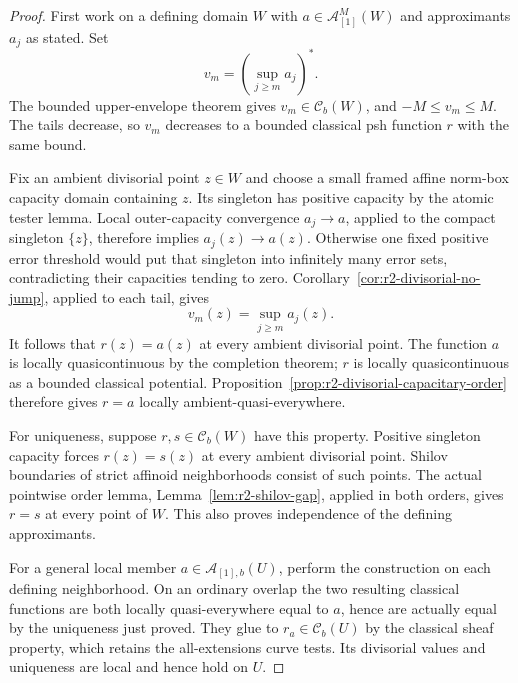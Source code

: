 \documentclass[11pt,a4paper]{article}
\numberwithin{equation}{section}
\theoremstyle{definition}
\theoremstyle{remark}
\newcommand{\Cb}{\mathcal C_b}
\begin{document}
\begin{proof}
First work on a defining domain $W$ with
$a\in\mathcal A^M_{[1]}(W)$ and approximants $a_j$ as stated.
Set
\[
 v_m=\left(\sup_{j\geq m}a_j\right)^*.
\]
The bounded upper-envelope theorem gives $v_m\in\Cb(W)$,
and $-M\leq v_m\leq M$. The tails decrease, so $v_m$ decreases
to a bounded classical psh function $r$ with the same bound.

Fix an ambient divisorial point $z\in W$ and choose a small
framed affine norm-box capacity domain containing $z$. Its
singleton has positive capacity by the atomic tester lemma.
Local outer-capacity convergence $a_j\to a$, applied to the
compact singleton $\{z\}$, therefore implies
$a_j(z)\to a(z)$. Otherwise one fixed positive error threshold
would put that singleton into infinitely many error sets,
contradicting their capacities tending to zero.
Corollary~\ref{cor:r2-divisorial-no-jump}, applied to each tail,
gives
\[
 v_m(z)=\sup_{j\geq m}a_j(z).
\]
It follows that $r(z)=a(z)$ at every ambient divisorial point.
The function $a$ is locally quasicontinuous by the completion
theorem; $r$ is locally quasicontinuous as a bounded classical
potential. Proposition~\ref{prop:r2-divisorial-capacitary-order}
therefore gives $r=a$ locally ambient-quasi-everywhere.

For uniqueness, suppose $r,s\in\Cb(W)$ have this property.
Positive singleton capacity forces $r(z)=s(z)$ at every
ambient divisorial point. Shilov boundaries of strict affinoid
neighborhoods consist of such points. The actual pointwise
order lemma, Lemma~\ref{lem:r2-shilov-gap}, applied in both
orders, gives $r=s$ at every point of $W$. This also proves
independence of the defining approximants.

For a general local member $a\in\mathcal A_{[1],b}(U)$,
perform the construction on each defining neighborhood.
On an ordinary overlap the two resulting classical functions
are both locally quasi-everywhere equal to $a$, hence are
actually equal by the uniqueness just proved. They glue to
$r_a\in\Cb(U)$ by the classical sheaf property, which retains
the all-extensions curve tests. Its divisorial values and
uniqueness are local and hence hold on $U$.
\end{proof}
\end{document}
